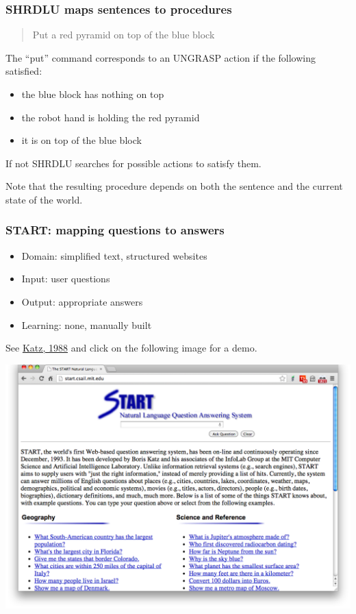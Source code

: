 \documentclass[ignorenonframetext]{beamer}
\begin{document}
\begin{frame}\frametitle{SHRDLU maps sentences to procedures}
\begin{quote}
Put a red pyramid on top of the blue block
\end{quote}

The ``put'' command corresponds to an UNGRASP action if the following satisfied:
\begin{itemize}
\item the blue block has nothing on top
\item the robot hand is holding the red pyramid
\item it is on top of the blue block
\end{itemize}
If not SHRDLU searches for possible actions to satisfy them.
\vspace*{1em}

\color{red} 
Note that the resulting procedure depends on both the sentence
and the current state of the world.
\end{frame}

\begin{frame}\frametitle{START: mapping questions to answers}

\begin{itemize}
\item Domain: simplified text, structured websites
\item Input: user questions
\item Output: appropriate answers
\item Learning: none, manually built
\end{itemize}

See \href{ftp://publications.ai.mit.edu/ai-publications/pdf/AIM-1096.pdf}{Katz, 1988}
and click on the following image for a demo.

\begin{center}
\href{http://start.csail.mit.edu}{
\includegraphics[width=.7\textwidth]{images/katz-start.png}}
\end{center}

\end{frame}
\end{document}
